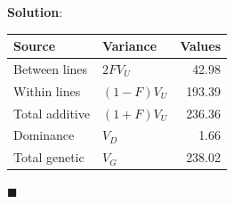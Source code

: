 \documentclass[
]{article}
\newcommand{\solstart}
{\vspace{3ex}\textbf{Solution}:}
\newcommand{\solend}
{\vspace{2ex}$\blacksquare$}
\begin{document}
\vspace{3ex}
\solstart

\begin{table}[H]
\centering
\begin{tabular}{llr}
\toprule
Source & Variance & Values\\
\midrule
Between lines & $2FV_U$ & 42.98\\
Within lines & $(1-F)V_U$ & 193.39\\
Total additive & $(1+F)V_U$ & 236.36\\
Dominance & $V_D$ & 1.66\\
Total genetic & $V_G$ & 238.02\\
\bottomrule
\end{tabular}
\end{table}

\solend
\end{document}
